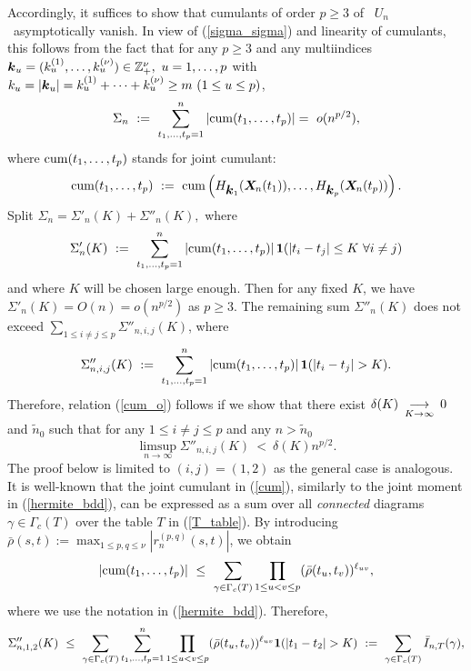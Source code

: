 \documentclass[10pt]{article}
\def\Z{\mathbb{Z}}
\newcommand{\mbf}[1]{\mbox{\boldmath $#1$}}
\def\limiteK{\renewcommand{\arraystretch}{0.5}
\begin{array}[t]{c}
\stackrel{}{\longrightarrow} \\
{\scriptstyle K \rightarrow\infty}
\end{array}\renewcommand{\arraystretch}{1}}
\begin{document}
Accordingly, it suffices to show that cumulants of order $p \ge 3$
of \ $U_n$ \  asymptotically vanish. In view of
(\ref{sigma_sigma}) and linearity of cumulants, this follows from
the fact that for any $p\ge 3$ and any multiindices ${\mbf k}_u =
(k^{(1)}_u, \dots, k^{(\nu)}_u) \in {\Z}^\nu_+, \  u=1, \dots, p$
with $k_u = |{\mbf k}_u| = k^{(1)}_u+ \dots + k^{(\nu)}_u \ge m \
(1\le u \le p)$,
\begin{equation}
\Sigma_n \ := \ \sum_{t_1, \dots, t_p =1}^n |{\rm cum}(t_1, \dots,
t_p)|   = \  o(n^{p/2}),  \label{cum_o}
\end{equation}
where ${\rm cum}(t_1, \dots, t_p)$ stands for joint cumulant:
\begin{equation}
{\rm cum}(t_1, \dots, t_p) \ := \ {\rm cum}\left(H_{{\mbf
k}_1}({\mbf X}_{\! n}(t_1)), \dots,  H_{{\mbf k}_p}({\mbf X}_{\!
n}(t_p))   \right). \label{cum}
\end{equation}
Split  $\Sigma_n = \Sigma'_n(K) + \Sigma''_n(K), $ where
$$
\Sigma'_n(K)  \  := \ \sum_{t_1, \dots,t_p=1}^n  \left|{\rm
cum}(t_1,\dots,t_p)\right| {\mbf 1}(|t_i-t_j| \le K \  \forall
i\ne j)
$$
and where $K $ will be chosen large enough. Then for any fixed
$K$, we have $\Sigma'_n(K) = O(n) = o(n^{p/2}) $ as $p\ge 3$. The
remaining sum $\Sigma''_n(K)$ does not exceed $\sum_{1\le i \ne j
\le p} \Sigma''_{n,i,j}(K)$, where
$$
\Sigma''_{n,i,j}(K)\ := \ \sum_{t_1, \dots, t_p=1}^n \left|{\rm
cum}(t_1,\dots,t_p)\right| {\mbf 1}(|t_i-t_j| > K).
$$
Therefore, relation (\ref{cum_o}) follows if we show that there
exist $\delta(K)  \limiteK 0$ and $\tilde n_0$ such that for any
$1\le i\ne j \le p$ and any $n> \tilde n_0$
\begin{equation}
\limsup_{n\to \infty} \Sigma''_{n,i,j}(K) \ < \  \delta(K) n^{p/2}.
\label{delta_K}
\end{equation}
The proof below is limited to $(i,j)=(1,2)$ as the general case is
analogous. It is well-known that the joint cumulant in
(\ref{cum}), similarly to the joint moment in (\ref{hermite_bdd}),
can be expressed as a sum over all {\em connected} diagrams
$\gamma \in \Gamma_c(T)$ over the table $T$ in (\ref{T_table}). By
introducing $\bar \rho (s,t) := \max_{1\le p,q \le \nu}
\left|r^{(p,q)}_n(s,t)\right|$,  we obtain
\begin{equation}
|{\rm cum}(t_1, \dots, t_p)| \ \le \ \sum_{\gamma \in \Gamma_c(T)}
\prod_{1 \le u <v \le p} (\bar \rho (t_u,t_v))^{\ell_{uv}},
\label{T1}
\end{equation}
where we use the notation in (\ref{hermite_bdd}). Therefore,
$$
\Sigma''_{n,1,2}(K) \  \le \  \sum_{\gamma \in \Gamma_c(T)}
\sum_{t_1, \dots, t_p =1}^n \prod_{1 \le u <v \le p} (\bar \rho
(t_u,t_v))^{\ell_{uv}} {\mbf 1}(|t_1-t_2|>K) \ := \ \sum_{\gamma
\in \Gamma_c(T)} \bar I_{n,T}(\gamma),
$$
\end{document}

